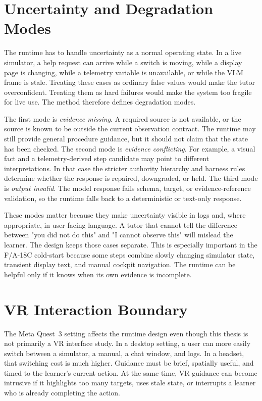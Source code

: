 \section{Uncertainty and Degradation Modes}\label{sec:design-degradation}

The runtime has to handle uncertainty as a normal operating state. In a live
simulator, a help request can arrive while a switch is moving, while a display
page is changing, while a telemetry variable is unavailable, or while the VLM
frame is stale. Treating these cases as ordinary false values would make the
tutor overconfident. Treating them as hard failures would make the system too
fragile for live use. The method therefore defines degradation modes.

The first mode is \emph{evidence missing}. A required source is not available,
or the source is known to be outside the current observation contract. The
runtime may still provide general procedure guidance, but it should not claim
that the state has been checked. The second mode is \emph{evidence conflicting}.
For example, a visual fact and a telemetry-derived step candidate may point to
different interpretations. In that case the stricter authority hierarchy and
harness rules determine whether the response is repaired, downgraded, or held.
The third mode is \emph{output invalid}. The model response fails schema,
target, or evidence-reference validation, so the runtime falls back to a
deterministic or text-only response.

These modes matter because they make uncertainty visible in logs and, where
appropriate, in user-facing language. A tutor that cannot tell the difference
between "you did not do this" and "I cannot observe this" will mislead the
learner. The design keeps those cases separate. This is especially
important in the F/A-18C cold-start because some steps combine slowly changing
simulator state, transient display text, and manual cockpit navigation. The
runtime can be helpful only if it knows when its own evidence is incomplete.

\section{VR Interaction Boundary}\label{sec:design-vr-boundary}

The Meta Quest~3 setting affects the runtime design even though this thesis is
not primarily a VR interface study. In a desktop setting, a user can more
easily switch between a simulator, a manual, a chat window, and logs. In a
headset, that switching cost is much higher. Guidance must be brief, spatially
useful, and timed to the learner's current action. At the same time, VR
guidance can become intrusive if it highlights too many targets, uses stale
state, or interrupts a learner who is already completing the action.


